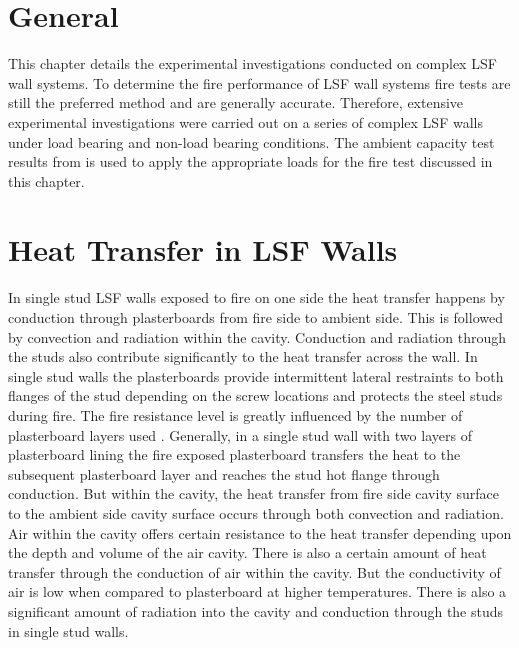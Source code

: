 \section{General}
This chapter details the experimental investigations conducted on complex LSF wall systems. To determine the fire performance of LSF wall systems fire tests are still the preferred method and are generally accurate. Therefore, extensive experimental investigations were carried out on a series of complex LSF walls under load bearing and non-load bearing conditions. The ambient capacity test results from  is used to apply the appropriate loads for the fire test discussed in this chapter.

\section{Heat Transfer in LSF Walls}

In single stud LSF walls exposed to fire on one side the heat transfer happens by conduction through plasterboards from fire side to ambient side. This is followed by convection and radiation within the cavity. Conduction and radiation through the studs also contribute significantly to the heat transfer across the wall. In single stud walls the plasterboards provide intermittent lateral restraints to both flanges of the stud depending on the screw locations and protects the steel studs during fire. The fire resistance level is greatly influenced by the number of plasterboard layers used \citet{Kodur2006,Ariyanayagam2016}. Generally, in a single stud wall with two layers of plasterboard lining the fire exposed plasterboard transfers the heat to the subsequent plasterboard layer and reaches the stud hot flange through conduction. But within the cavity, the heat transfer from fire side cavity surface to the ambient side cavity surface occurs through both convection and radiation. Air within the cavity offers certain resistance to the heat transfer depending upon the depth and volume of the air cavity.  There is also a certain amount of heat transfer through the conduction of air within the cavity. But the conductivity of air is low when compared to plasterboard at higher temperatures. There is also a significant amount of radiation into the cavity and conduction through the studs in single stud walls. 

